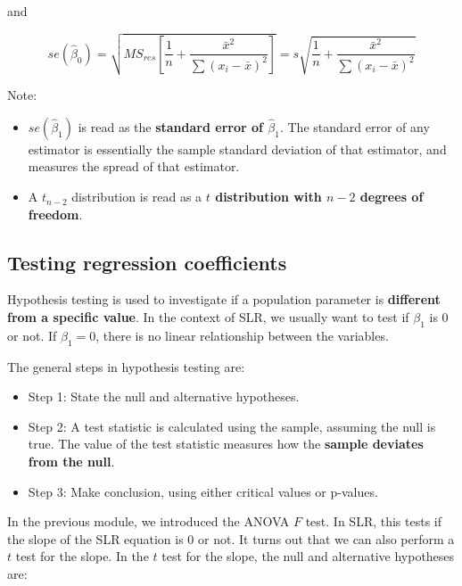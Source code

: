 \documentclass[
]{book}
\providecommand{\tightlist}{%
  \setlength{\itemsep}{0pt}\setlength{\parskip}{0pt}}
\begin{document}
and

\begin{equation} 
se(\hat{\beta}_0) = \sqrt{MS_{res}\left[\frac{1}{n} + \frac{\bar{x}^2}{\sum (x_i -\bar{x})^2}\right]} = s \sqrt{\frac{1}{n} + \frac{\bar{x}^2}{\sum (x_i -\bar{x})^2}}
\label{eq:seb0}
\end{equation}

Note:

\begin{itemize}
\item
  \(se(\hat{\beta}_1)\) is read as the \textbf{standard error of \(\hat{\beta}_1\)}. The standard error of any estimator is essentially the sample standard deviation of that estimator, and measures the spread of that estimator.
\item
  A \(t_{n-2}\) distribution is read as a \textbf{\(t\) distribution with \(n-2\) degrees of freedom}.
\end{itemize}

\hypertarget{testing-regression-coefficients}{%
\subsection{Testing regression coefficients}\label{testing-regression-coefficients}}

Hypothesis testing is used to investigate if a population parameter is \textbf{different from a specific value}. In the context of SLR, we usually want to test if \(\beta_1\) is 0 or not. If \(\beta_1 = 0\), there is no linear relationship between the variables.

The general steps in hypothesis testing are:

\begin{itemize}
\tightlist
\item
  Step 1: State the null and alternative hypotheses.
\item
  Step 2: A test statistic is calculated using the sample, assuming the null is true. The value of the test statistic measures how the \textbf{sample deviates from the null}.
\item
  Step 3: Make conclusion, using either critical values or p-values.
\end{itemize}

In the previous module, we introduced the ANOVA \(F\) test. In SLR, this tests if the slope of the SLR equation is 0 or not. It turns out that we can also perform a \(t\) test for the slope. In the \(t\) test for the slope, the null and alternative hypotheses are:
\end{document}
